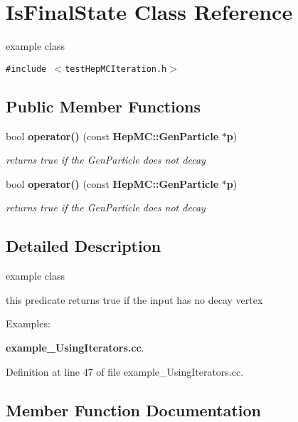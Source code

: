 \section{Is\-Final\-State Class Reference}
\label{classIsFinalState}
example class  


{\tt \#include $<$test\-Hep\-MCIteration.h$>$}

\subsection*{Public Member Functions}
\begin{CompactItemize}
\item 
bool {\bf operator()} (const {\bf Hep\-MC::Gen\-Particle} $\ast${\bf p})
\begin{CompactList}\small\item\em returns true if the Gen\-Particle does not decay \item\end{CompactList}\item 
bool {\bf operator()} (const {\bf Hep\-MC::Gen\-Particle} $\ast${\bf p})
\begin{CompactList}\small\item\em returns true if the Gen\-Particle does not decay \item\end{CompactList}\end{CompactItemize}


\subsection{Detailed Description}
example class 

this predicate returns true if the input has no decay vertex \begin{Desc}
\item[Examples: ]\par


{\bf example\_\-Using\-Iterators.cc}.\end{Desc}




Definition at line 47 of file example\_\-Using\-Iterators.cc.

\subsection{Member Function Documentation}
